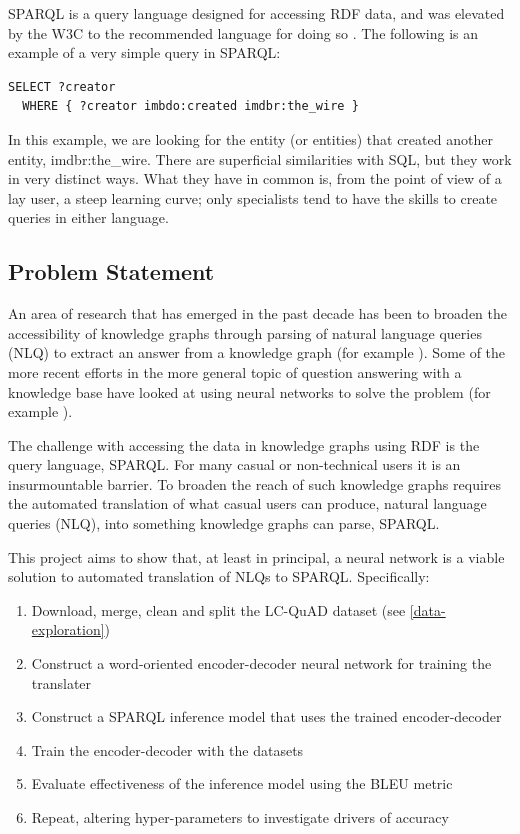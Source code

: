 \documentclass[12pt]{article}
\begin{document}
SPARQL is a query language designed for accessing RDF data, and was
elevated by the W3C to the recommended language for doing so
\cite{w3cSPARQL}. The following is an example of a very simple query in
SPARQL:

\begin{lstlisting}[language=SPARQL]
  SELECT ?creator
  WHERE { ?creator imbdo:created imdbr:the_wire }
\end{lstlisting}

In this example, we are looking for the entity (or entities) that
created another entity, imdbr:the\_wire. There are superficial
similarities with SQL, but they work in very distinct ways. What they
have in common is, from the point of view of a lay user, a steep
learning curve; only specialists tend to have the skills to create
queries in either language.

\subsection{Problem Statement}\label{problem-statement}
An area of research that has emerged in the past decade has been to
broaden the accessibility of knowledge graphs through parsing of natural
language queries (NLQ) to extract an answer from a knowledge graph (for
example \cite{Yahya:2012:NLQ:2390948.2390995}). Some of the more recent
efforts in the more general topic of question answering with a knowledge
base have looked at using neural networks to solve the problem (for
example \cite{liang2016neural}).

The challenge with accessing the data in knowledge graphs using RDF is
the query language, SPARQL. For many casual or non-technical users it is
an insurmountable barrier. To broaden the reach of such knowledge graphs
requires the automated translation of what casual users can produce,
natural language queries (NLQ), into something knowledge graphs can
parse, SPARQL.

This project aims to show that, at least in principal, a neural network
is a viable solution to automated translation of NLQs to SPARQL. Specifically:

\begin{enumerate}
  \item Download, merge, clean and split the LC-QuAD dataset (see \ref{data-exploration})
  \item Construct a word-oriented encoder-decoder neural network for training the translater
  \item Construct a SPARQL inference model that uses the trained encoder-decoder
  \item Train the encoder-decoder with the datasets
  \item Evaluate effectiveness of the inference model using the BLEU metric
  \item Repeat, altering hyper-parameters to investigate drivers of accuracy
\end{enumerate}
\end{document}
